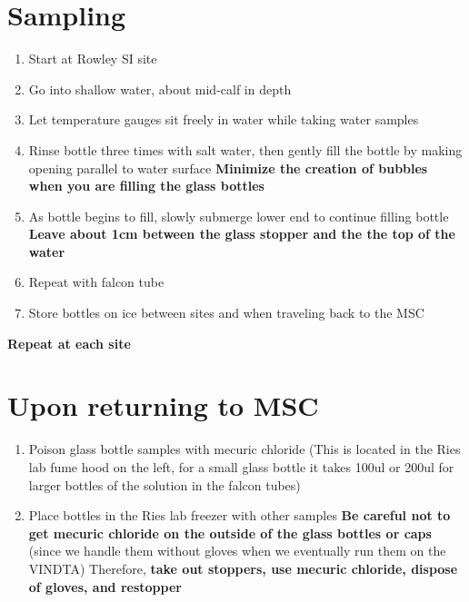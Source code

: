 \documentclass[
  letterpaper,
  DIV=11,
  numbers=noendperiod]{scrreprt}
\begin{document}
\hypertarget{sampling}{%
\section*{\texorpdfstring{\textbf{Sampling}}{Sampling}}\label{sampling}}


\begin{enumerate}
\def\labelenumi{\arabic{enumi}.}
\item
  Start at Rowley SI site
\item
  Go into shallow water, about mid-calf in depth
\item
  Let temperature gauges sit freely in water while taking water samples
\item
  Rinse bottle three times with salt water, then gently fill the bottle
  by making opening parallel to water surface \textbf{Minimize the
  creation of bubbles when you are filling the glass bottles}
\item
  As bottle begins to fill, slowly submerge lower end to continue
  filling bottle \textbf{Leave about 1cm between the glass stopper and
  the the top of the water}
\item
  Repeat with falcon tube
\item
  Store bottles on ice between sites and when traveling back to the MSC
\end{enumerate}

\textbf{Repeat at each site}

\hypertarget{upon-returning-to-msc}{%
\section*{\texorpdfstring{\textbf{Upon returning to
MSC}}{Upon returning to MSC}}\label{upon-returning-to-msc}}


\begin{enumerate}
\def\labelenumi{\arabic{enumi}.}
\item
  Poison glass bottle samples with mecuric chloride (This is located in
  the Ries lab fume hood on the left, for a small glass bottle it takes
  100ul or 200ul for larger bottles of the solution in the falcon tubes)
\item
  Place bottles in the Ries lab freezer with other samples \textbf{Be
  careful not to get mecuric chloride on the outside of the glass
  bottles or caps} (since we handle them without gloves when we
  eventually run them on the VINDTA) Therefore, \textbf{take out
  stoppers, use mecuric chloride, dispose of gloves, and restopper}
\end{enumerate}
\end{document}
